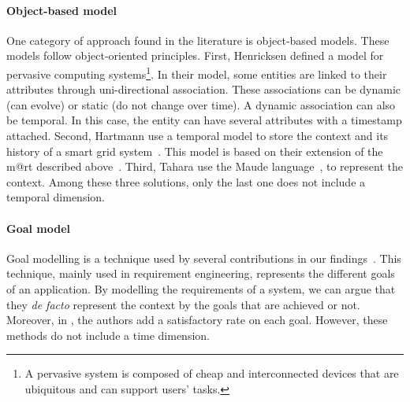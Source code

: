 \paragraph{Object-based model}
One category of approach found in the literature is object-based models.
These models follow object-oriented principles.
First, Henricksen \etal defined a model for pervasive computing systems\footnote{A pervasive system is composed of cheap and interconnected devices that are ubiquitous and can support users' tasks.\cite{DBLP:conf/pervasive/HenricksenIR02}}.
In their model, some entities are linked to their attributes through uni-directional association.
These associations can be dynamic (can evolve) or static (do not change over time).
A dynamic association can also be temporal.
In this case, the entity can have several attributes with a timestamp attached.
Second, Hartmann \etal use a temporal model to store the \gls{context} and its history of a smart grid system~\cite{DBLP:conf/smartgridsec/0001FKNT14}.
This model is based on their extension of the \gls{m@rt} described above~\cite{DBLP:conf/seke/0001FNMKT14, DBLP:conf/models/0001FNMKBT14}.
Third, Tahara \etal \cite{DBLP:conf/icse/TaharaOH17} use the Maude language~\cite{DBLP:journals/tcs/ClavelDELMMQ02}, to represent the context. 
Among these three solutions, only the last one does not include a temporal dimension.

\paragraph{Goal model}
Goal modelling is a technique used by several contributions in our findings~\cite{DBLP:conf/icse/CailliauL17, DBLP:conf/icse/IftikharW14a, DBLP:conf/icse/MendoncaAR14, DBLP:conf/icse/ChenPYNZ14, DBLP:conf/re/BaresiPS10}.
This technique, mainly used in requirement engineering, represents the different goals of an application.
By modelling the requirements of a system, we can argue that they \textit{de facto} represent the \gls{context} by the goals that are achieved or not.
Moreover, in \cite{DBLP:conf/icse/CailliauL17}, the authors add a satisfactory rate on each goal.
However, these methods do not include a time dimension.

